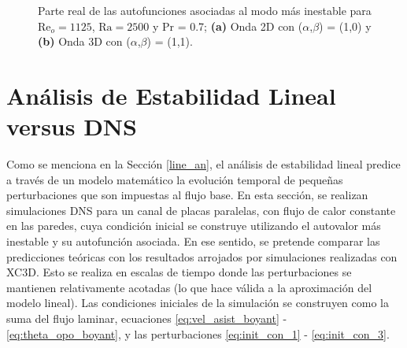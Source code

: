 \newpage

\begin{figure}[H]
 \centering
 	\caption{Parte real de las autofunciones asociadas al modo más inestable para $\text{Re}_o=1125$, $\text{Ra}=2500$ y Pr = 0.7; \textbf{(a)} Onda 2D con ($\alpha$,$\beta$) = (1,0) y \textbf{(b)} Onda 3D con ($\alpha$,$\beta$) = (1,1).} 
 \label{fig:eigenfun_valid}
\end{figure}

\section{Análisis de Estabilidad Lineal versus DNS}

Como se menciona en la Sección \ref{line_an}, el análisis de estabilidad lineal predice a través de un modelo matemático la evolución temporal de pequeñas perturbaciones que son impuestas al flujo base. En esta sección, se realizan simulaciones DNS para un canal de placas paralelas, con flujo de calor constante en las paredes, cuya condición inicial se construye utilizando el autovalor más inestable y su autofunción asociada. En ese sentido, se pretende comparar las predicciones teóricas con los resultados arrojados por simulaciones realizadas con XC3D. Esto se realiza en escalas de tiempo donde las perturbaciones se mantienen relativamente acotadas (lo que hace válida a la aproximación del modelo lineal). Las condiciones iniciales de la simulación se construyen como la suma del flujo laminar, ecuaciones \ref{eq:vel_asist_boyant} - \ref{eq:theta_opo_boyant}, y las perturbaciones \ref{eq:init_con_1} - \ref{eq:init_con_3}. 

